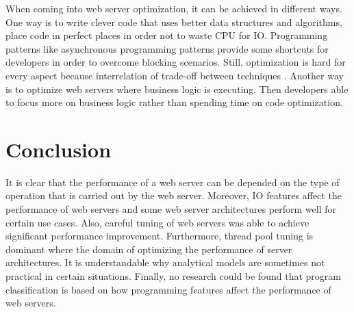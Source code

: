 When coming into web server optimization, it can be achieved in different ways. One way is to write clever code that uses better data structures and algorithms, place code in perfect places in order not to waste CPU for IO. Programming patterns like asynchronous programming patterns provide some shortcuts for developers in order to overcome blocking scenarios. Still, optimization is hard for every aspect because interrelation of trade-off between techniques \cite{wescott2013every,Adewumi+2018+115+122}.  Another way is to optimize web servers where business logic is executing. Then developers able to focus more on business logic rather than spending time on code optimization.



\section{Conclusion}

It is clear that the performance of a web server can be depended on the type of operation that is carried out by the web server. Moreover, IO features affect the performance of web servers and some web server architectures perform well for certain use cases. Also, careful tuning of web servers was able to achieve significant performance improvement. Furthermore, thread pool tuning is dominant where the domain of optimizing the performance of server architectures. It is understandable why analytical models are sometimes not practical in certain situations. Finally, no research could be found that program classification is based on how programming features affect the performance of web servers.   

